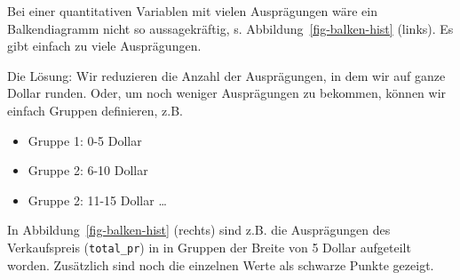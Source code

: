 \documentclass[
  a4paper,
  DIV=11]{scrreprt}
\providecommand{\tightlist}{%
  \setlength{\itemsep}{0pt}\setlength{\parskip}{0pt}}\usepackage{longtable,booktabs,array}
\theoremstyle{definition}
\theoremstyle{definition}
\theoremstyle{definition}
\theoremstyle{remark}
\begin{document}
Bei einer quantitativen Variablen mit vielen Ausprägungen wäre ein
Balkendiagramm nicht so aussagekräftig, s.
Abbildung~\ref{fig-balken-hist} (links). Es gibt einfach zu viele
Ausprägungen.

Die Lösung: Wir reduzieren die Anzahl der Ausprägungen, in dem wir auf
ganze Dollar runden. Oder, um noch weniger Ausprägungen zu bekommen,
können wir einfach Gruppen definieren, z.B.

\begin{itemize}
\tightlist
\item
  Gruppe 1: 0-5 Dollar
\item
  Gruppe 2: 6-10 Dollar
\item
  Gruppe 2: 11-15 Dollar \ldots{}
\end{itemize}

In Abbildung~\ref{fig-balken-hist} (rechts) sind z.B. die Ausprägungen
des Verkaufspreis (\texttt{total\_pr}) in in Gruppen der Breite von 5
Dollar aufgeteilt worden. Zusätzlich sind noch die einzelnen Werte als
schwarze Punkte gezeigt.
\end{document}
